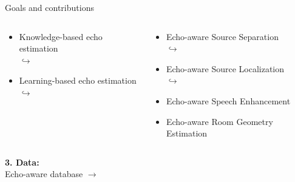 \begin{frame}{Goals and contributions}
    \pause
    \begin{columns}[T]
        \begin{column}{0.48\textwidth}
            \begin{itemize}
                \item Knowledge-based echo estimation
                \\$\hookrightarrow$ \blaster
                \item Learning-based echo estimation
                \\$\hookrightarrow$ \lantern
            \end{itemize}
        \end{column}
        \pause
        \begin{column}{0.48\textwidth}
            \begin{itemize}
                \item Echo-aware Source Separation
                \\$\hookrightarrow$ \separake
                \item Echo-aware Source Localization
                \\$\hookrightarrow$ \mirage
                \item Echo-aware Speech Enhancement
                \item Echo-aware Room Geometry Estimation
            \end{itemize}
        \end{column}
    \end{columns}
    \pause
    \begin{center}
        \textbf{3. Data:}
        \\Echo-aware database $\rightarrow$ \dechorate
    \end{center}
\end{frame}

